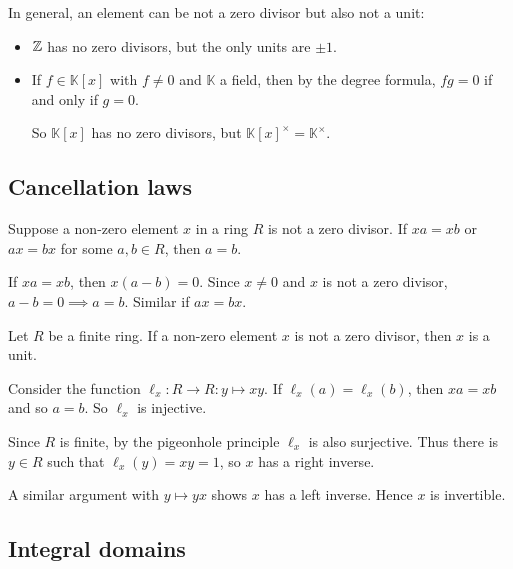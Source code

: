 \documentclass[12pt,letterpaper]{report}
\begin{document}
In general, an element can be not a zero divisor but also not a unit:
\begin{itemize}
  \item $\mathbb{Z}$ has no zero divisors, but the only units are $\pm 1$.
  \item If $f \in \mathbb{K}[x]$ with $f \neq 0$ and $\mathbb{K}$ a field, then by the degree
    formula, $fg = 0$ if and only if $g = 0$.

    So $\mathbb{K}[x]$ has no zero divisors, but $\mathbb{K}[x]^\times = \mathbb{K}^\times$.
\end{itemize}

\pagebreak
\subsection{Cancellation laws}

\begin{prop}{}{}
  Suppose a non-zero element $x$ in a ring $R$ is not a zero divisor.
  If $xa = xb$ or $ax = bx$ for some $a, b \in R$, then $a = b$.
\end{prop}

\begin{thmproof}
  If $xa = xb$, then $x(a - b) = 0$.
  Since $x \neq 0$ and $x$ is not a zero divisor, $a - b = 0 \implies a = b$.
  Similar if $ax = bx$.
\end{thmproof}

\begin{cor}{}{}
  Let $R$ be a finite ring.
  If a non-zero element $x$ is not a zero divisor, then $x$ is a unit.
\end{cor}

\begin{thmproof}
  Consider the function $\ell_x \colon R \to R : y \mapsto xy$.
  If $\ell_x(a) = \ell_x(b)$, then $xa = xb$ and so $a = b$.
  So $\ell_x$ is injective.

  Since $R$ is finite, by the pigeonhole principle $\ell_x$ is also surjective.
  Thus there is $y \in R$ such that $\ell_x(y) = xy = 1$, so $x$ has a right inverse.

  A similar argument with $y \mapsto yx$ shows $x$ has a left inverse.
  Hence $x$ is invertible.
\end{thmproof}

\pagebreak
\subsection{Integral domains}
\end{document}
